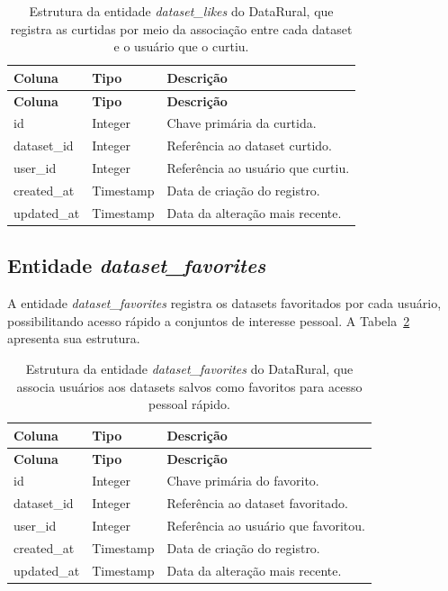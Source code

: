 \begin{longtable}{p{}p{}p{}}
\caption{Estrutura da entidade \textit{dataset\_likes} do DataRural, que registra as curtidas por meio da associação entre cada dataset e o usuário que o curtiu.}\label{tab:entity_dataset_likes}\\
\toprule
\textbf{Coluna} & \textbf{Tipo} & \textbf{Descrição} \\
\midrule
\endfirsthead
\toprule
\textbf{Coluna} & \textbf{Tipo} & \textbf{Descrição} \\
\midrule
\endhead
id & Integer & Chave primária da curtida. \\
dataset\_id & Integer & Referência ao dataset curtido. \\
user\_id & Integer & Referência ao usuário que curtiu. \\
created\_at & Timestamp & Data de criação do registro. \\
updated\_at & Timestamp & Data da alteração mais recente. \\
\bottomrule
\end{longtable}

\subsection{Entidade \textit{dataset\_favorites}}

A entidade \textit{dataset\_favorites} registra os datasets favoritados por cada usuário, possibilitando acesso rápido a conjuntos de interesse pessoal. A Tabela~\ref{tab:entity_dataset_favorites} apresenta sua estrutura.

\begin{longtable}{p{}p{}p{}}
\caption{Estrutura da entidade \textit{dataset\_favorites} do DataRural, que associa usuários aos datasets salvos como favoritos para acesso pessoal rápido.}\label{tab:entity_dataset_favorites}\\
\toprule
\textbf{Coluna} & \textbf{Tipo} & \textbf{Descrição} \\
\midrule
\endfirsthead
\toprule
\textbf{Coluna} & \textbf{Tipo} & \textbf{Descrição} \\
\midrule
\endhead
id & Integer & Chave primária do favorito. \\
dataset\_id & Integer & Referência ao dataset favoritado. \\
user\_id & Integer & Referência ao usuário que favoritou. \\
created\_at & Timestamp & Data de criação do registro. \\
updated\_at & Timestamp & Data da alteração mais recente. \\
\bottomrule
\end{longtable}

